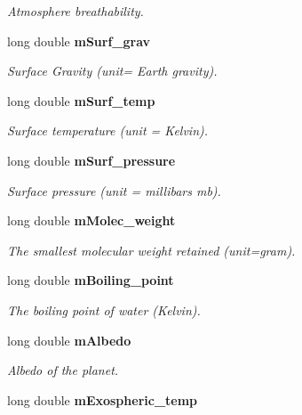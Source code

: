 \begin{CompactItemize}
\begin{CompactList}\small\item\em Atmosphere breathability. \item\end{CompactList}\item 
long double {\bf m\-Surf\_\-grav}\label{class_s_g___planet_p21}

\begin{CompactList}\small\item\em Surface Gravity (unit= Earth gravity). \item\end{CompactList}\item 
long double {\bf m\-Surf\_\-temp}\label{class_s_g___planet_p22}

\begin{CompactList}\small\item\em Surface temperature (unit = Kelvin). \item\end{CompactList}\item 
long double {\bf m\-Surf\_\-pressure}\label{class_s_g___planet_p23}

\begin{CompactList}\small\item\em Surface pressure (unit = millibars mb). \item\end{CompactList}\item 
long double {\bf m\-Molec\_\-weight}\label{class_s_g___planet_p24}

\begin{CompactList}\small\item\em The smallest molecular weight retained (unit=gram). \item\end{CompactList}\item 
long double {\bf m\-Boiling\_\-point}\label{class_s_g___planet_p26}

\begin{CompactList}\small\item\em The boiling point of water (Kelvin). \item\end{CompactList}\item 
long double {\bf m\-Albedo}\label{class_s_g___planet_p27}

\begin{CompactList}\small\item\em Albedo of the planet. \item\end{CompactList}\item 
long double {\bf m\-Exospheric\_\-temp}\label{class_s_g___planet_p28}


\end{CompactItemize}
